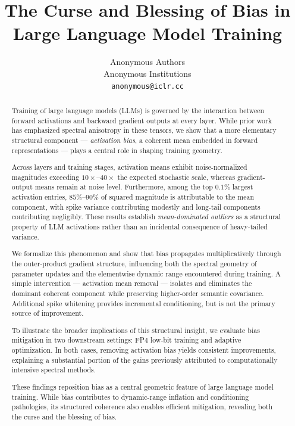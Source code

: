 \documentclass{article}
\title{The Curse and Blessing of Bias in Large Language Model Training}
\author{
  Anonymous Authors\\
  Anonymous Institutions\\
  \texttt{anonymous@iclr.cc}
}
\begin{document}
\maketitle

\begin{abstract}

Training of large language models (LLMs) is governed by the interaction between
forward activations and backward gradient outputs at every layer.
While prior work has emphasized spectral anisotropy in these tensors,
we show that a more elementary structural component --- 
\emph{activation bias}, a coherent mean embedded in forward representations ---
plays a central role in shaping training geometry.

Across layers and training stages, activation means exhibit
noise-normalized magnitudes exceeding $10\times$--$40\times$
the expected stochastic scale, whereas gradient-output means remain at noise level.
Furthermore, among the top $0.1\%$ largest activation entries,
$85\%$--$90\%$ of squared magnitude is attributable to the mean component,
with spike variance contributing modestly and long-tail components contributing
negligibly.
These results establish \emph{mean-dominated outliers} as a structural property
of LLM activations rather than an incidental consequence of heavy-tailed variance.

We formalize this phenomenon and show that bias propagates multiplicatively
through the outer-product gradient structure, influencing both the spectral
geometry of parameter updates and the elementwise dynamic range encountered
during training.
A simple intervention --- activation mean removal ---
isolates and eliminates the dominant coherent component while preserving
higher-order semantic covariance.
Additional spike whitening provides incremental conditioning,
but is not the primary source of improvement.

To illustrate the broader implications of this structural insight,
we evaluate bias mitigation in two downstream settings:
FP4 low-bit training and adaptive optimization.
In both cases, removing activation bias yields consistent improvements,
explaining a substantial portion of the gains previously attributed to
computationally intensive spectral methods.

These findings reposition bias as a central geometric feature of
large language model training.
While bias contributes to dynamic-range inflation and conditioning pathologies,
its structured coherence also enables efficient mitigation,
revealing both the curse and the blessing of bias.

\end{abstract}
\end{document}
